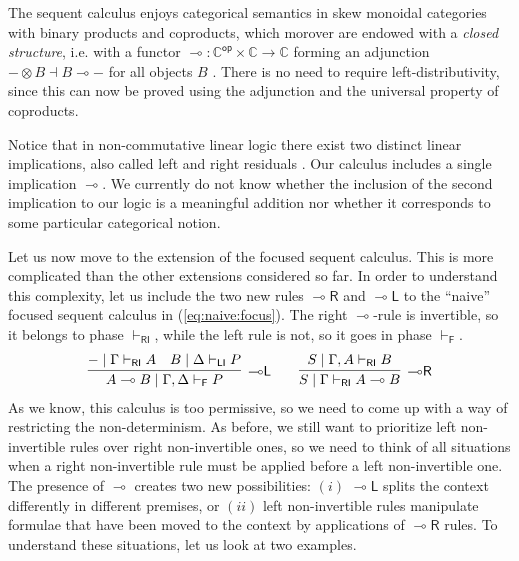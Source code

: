 \documentclass[submission,copyright,creativecommons]{eptcs}
\theoremstyle{definition}
\newcommand{\lright}{{\multimap}\mathsf{R}}
\newcommand{\lleft}{{\multimap}\mathsf{L}}
\newcommand{\ot}{\otimes}
\newcommand{\lolli}{\multimap}
\newcommand{\RI}{\mathsf{RI}}
\newcommand{\LI}{\mathsf{LI}}
\newcommand{\F}{\mathsf{F}}
\begin{document}
The sequent calculus enjoys categorical semantics in skew monoidal categories with binary products and coproducts, which morover are endowed with a \emph{closed structure}, i.e. with a functor $\lolli : \mathbb{C}^{\mathsf{op}} \times \mathbb{C} \rightarrow \mathbb{C}$ forming an adjunction ${-} \ot B \dashv B \lolli {-}$ for all objects $B$ \cite{street:skew-closed:2013}. There is no need to require left-distributivity, since this can now be proved using the adjunction and the universal property of coproducts.

Notice that in non-commutative linear logic there exist two distinct linear implications, also called left and right residuals \cite{lambek:mathematics:58}. Our calculus includes a single implication $\lolli$. We currently do not know whether the inclusion of the second implication to our logic is a meaningful addition nor whether it corresponds to some particular categorical notion. 

Let us now move to the extension of the focused sequent calculus. This is more complicated than the other extensions considered so far. In order to understand this complexity, let us include the two new rules $\lright$ and $\lleft$ to the ``naive'' focused sequent calculus in (\ref{eq:naive:focus}). The right $\lolli$-rule is invertible, so it belongs to phase $\vdash_\RI$, while the left rule is not, so it goes in phase $\vdash_\F$.
\begin{displaymath}
  \begin{array}{c}
    \infer[\lleft]{A \lolli B \mid \Gamma , \Delta \vdash_\F P}{
      - \mid \Gamma \vdash_\RI A
      &
      B \mid \Delta \vdash_\LI P
    }
    \qquad
    \infer[\lright]{S \mid \Gamma \vdash_\RI A \lolli B}{S \mid \Gamma , A \vdash_\RI B}
  \end{array}
\end{displaymath}
As we know, this calculus is too permissive, so we need to come up with a way of restricting the non-determinism. As before, we still want to prioritize left non-invertible rules over right non-invertible ones, so we need to think of all situations when a right non-invertible rule must be applied before a left non-invertible one. The presence of $\lolli$ creates two new possibilities: $(i)$ $\lleft$ splits the context differently in different premises, or $(ii)$ left non-invertible rules manipulate formulae that have been moved to the context by applications of $\lright$ rules. To understand these situations, let us look at two examples.
\end{document}
